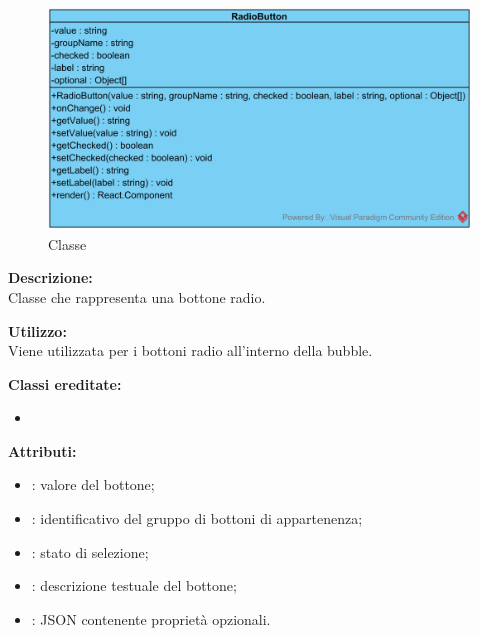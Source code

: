 \paragraph[::RadioButton]{\class}\mbox{}\\ \label{\class}
\begin{figure}[H]
	\centering
	\includegraphics[width=14cm]{./diagrammi/framework/view/gui/radiobutton.png}
	\caption{Classe \class}
\end{figure}
\textbf{Descrizione:}\\
Classe che rappresenta una bottone radio.

\textbf{Utilizzo:}\\
Viene utilizzata per i bottoni radio all'interno della bubble.

\textbf{Classi ereditate:}
\begin{itemize}
	\item {}
\end{itemize}


\textbf{Attributi:}
\begin{itemize}
	\item {}: valore del bottone;
	\item {}: identificativo del gruppo di bottoni di appartenenza;
	\item {}: stato di selezione;
	\item {}: descrizione testuale del bottone;
	\item {}: JSON contenente proprietà opzionali.
\end{itemize}

